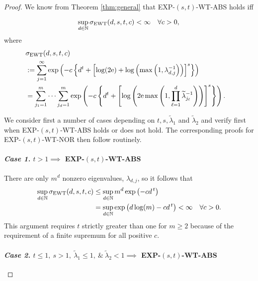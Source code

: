 \documentclass[graybox]{svmult}
\newcommand{\tlambda}{\widetilde{\lambda}}
\newcommand{\naturals}{\mathbb{N}}
\newcommand{\me}{\mathrm{e}}
\newcommand{\SEWT}{\sigma_{\textup{EWT}}}
\newcommand{\EXP}{\textup{EXP}\xspace}
\newcommand{\NOR}{\textup{NOR}\xspace}
\newcommand{\ABS}{\textup{ABS}\xspace}
\newcommand{\WT}{\textup{WT}\xspace}
\begin{document}
\begin{proof}

We know from Theorem \ref{thm:general} that \EXP-$(s,t)$-\WT-\ABS holds iff

        \begin{equation} \label{EXPWTcond}
        \sup_{d \in \naturals}  \SEWT(d,s,t ,c) < \infty \quad \forall c>0,\\
        \end{equation}
        where
        \begin{align}
        \nonumber
        \lefteqn{\SEWT(d,s,t,c )} \\
        \label{SEWTSingSum}
         & :=  \sum_{j=1}^\infty \exp\left( -c \left \{d^t + \left [ \log(2\me) + 
         \log \left(\max\left(1, \lambda_{d,j}^{-1} \right) \right) \right]^s \right \}\right) \\
         \label{SEWTmultisum}
        &=  \sum_{j_1=1}^m \cdots   \sum_{j_d=1}^m   \exp\left( -c \left \{ d^t + 
        \left [ \log \left(2 \me \max\left(1, \prod_{\ell = 1}^d \tlambda_{j_\ell}^{-1} \right) \right) \right]^s  \right\} \right).
        \end{align}



We consider first a number of cases depending on $t,s,\tlambda_1$ and
        $\tlambda_2$ and verify first when \EXP-$(s,t)$-\WT-\ABS holds or does
        not hold.  The corresponding proofs for \EXP-$(s,t)$-\WT-\NOR then follow routinely.


\paragraph{\textit{Case 1.} $t>1 \implies $ \EXP-$(s,t)$-\WT-\ABS}

        There are only $m^d$ nonzero eigenvalues,
$\lambda_{d,j}$, so it follows that
        \begin{align*}
        \sup_{d \in \naturals}
\SEWT(d,s,t,c )
&\le \sup_{d \in \naturals} m^d \exp\left( -c
d^{\,t}  \right) \\
        & = \sup_{d \in \naturals}  \exp\left(d \log(m) -c
d^{\,t}  \right) < \infty \quad \forall c > 0.
        \end{align*}
        This argument requires $t$ strictly greater than one
for $m\ge2$ because of the requirement of a finite supremum
for all positive $c$.

\paragraph{\textit{Case 2.} $t\le 1, \ s > 1,  \ \tlambda_1 \le 1, \ \& \ \tlambda_2< 1 \implies$ \EXP-$(s,t)$-\WT-\ABS} \label{Case111g} 


\end{proof}
\end{document}
